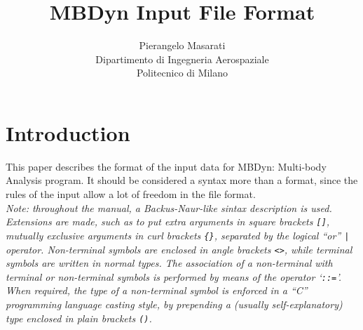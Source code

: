 \documentclass[10pt,dvips]{report}
\begin{document}
\title{\bf MBDyn Input File Format}
\author{Pierangelo Masarati \vspace{5mm}\\
    \sc Dipartimento di Ingegneria Aerospaziale \\
    \sc Politecnico di Milano
}
\date{}

\maketitle


\tableofcontents
\newpage

\chapter{Introduction}
This paper describes the format of the input data for MBDyn: 
Multi-body Analysis program.
It should be considered a syntax more than a format, since the rules of the
input allow a lot of freedom in the file format. \\
{\em
    Note: throughout the manual, a Backus-Naur-like sintax description is
    used. 
    Extensions are made, such as to put extra arguments in square brackets
    {\tt []}, mutually exclusive arguments in curl brackets {\tt \{\}},
    separated by the logical ``or'' {\tt |} operator.
    Non-terminal symbols are enclosed in angle brackets {\tt <>}, while
    terminal symbols are written in normal types.
    The association of a non-terminal with terminal or non-terminal
    symbols is performed by means of the operator `{\tt ::=}'. 
    When required, the type of a non-terminal symbol is enforced in a ``C''
    programming language casting style, by prepending a (usually
    self-explanatory) type enclosed in plain brackets {\tt ()}.
}
\end{document}
